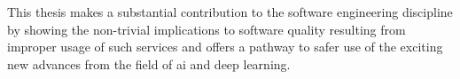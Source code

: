 This thesis makes a substantial contribution to the software engineering discipline by showing the non-trivial implications to software quality resulting from improper usage of such services and offers a pathway to safer use of the exciting new advances from the field of \gls{ai} and deep learning.


\vspace*{\fill}
\normalsize


